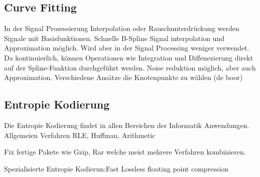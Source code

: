 \subsection{Curve Fitting}
In der Signal Prozessierung Interpolation oder Rauschunterdrückung werden Signale mit Basisfunktionen. \cite{unser1993b:spline} Schnelle B-Spline Signal interpolation und Approximation möglich. Wird aber in der Signal Processing weniger verwendet. Da kontinuierlich, können Operationen wie Integration und Diffenezierung direkt auf der Spline-Funktion durchgeführt werden. Noise reduktion möglich, aber auch Approximation. Verschiedene Ansätze die Knotenpunkte zu wählen (de boor)



\subsection{Entropie Kodierung}
Die Entropie Kodierung findet in allen Bereichen der Informatik Anwendungen. Allgemeien Verfahren RLE, Huffman, Arithmetic

Fix fertige Pakete wie Gzip, Rar welche meist mehrere Verfahren kombinieren.

Spezialisierte Entropie Kodierun:Fast Lossless floating point compression \cite{ratanaworabhan2006fast}